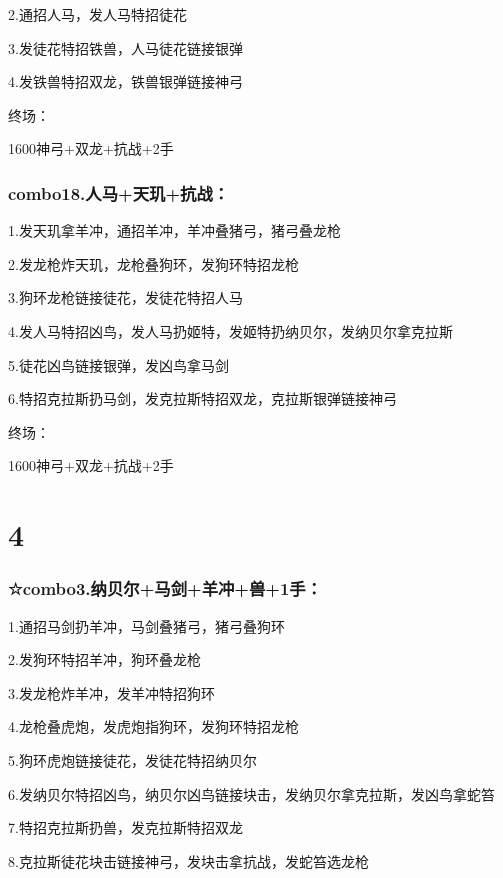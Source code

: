 \documentclass[
]{article}
\begin{document}
2.通招人马，发人马特招徒花

3.发徒花特招铁兽，人马徒花链接银弹

4.发铁兽特招双龙，铁兽银弹链接神弓

终场：

1600神弓+双龙+抗战+2手

\hypertarget{combo18.ux4ebaux9a6cux5929ux7391ux6297ux6218}{%
\subsubsection{combo18.人马+天玑+抗战：}\label{combo18.ux4ebaux9a6cux5929ux7391ux6297ux6218}}

1.发天玑拿羊冲，通招羊冲，羊冲叠猪弓，猪弓叠龙枪

2.发龙枪炸天玑，龙枪叠狗环，发狗环特招龙枪

3.狗环龙枪链接徒花，发徒花特招人马

4.发人马特招凶鸟，发人马扔姬特，发姬特扔纳贝尔，发纳贝尔拿克拉斯

5.徒花凶鸟链接银弹，发凶鸟拿马剑

6.特招克拉斯扔马剑，发克拉斯特招双龙，克拉斯银弹链接神弓

终场：

1600神弓+双龙+抗战+2手

\hypertarget{section-3}{%
\section{4}\label{section-3}}

\hypertarget{combo3.ux7eb3ux8d1dux5c14ux9a6cux5251ux7f8aux51b2ux517d1ux624b}{%
\subsubsection{☆combo3.纳贝尔+马剑+羊冲+兽+1手：}\label{combo3.ux7eb3ux8d1dux5c14ux9a6cux5251ux7f8aux51b2ux517d1ux624b}}

1.通招马剑扔羊冲，马剑叠猪弓，猪弓叠狗环

2.发狗环特招羊冲，狗环叠龙枪

3.发龙枪炸羊冲，发羊冲特招狗环

4.龙枪叠虎炮，发虎炮指狗环，发狗环特招龙枪

5.狗环虎炮链接徒花，发徒花特招纳贝尔

6.发纳贝尔特招凶鸟，纳贝尔凶鸟链接块击，发纳贝尔拿克拉斯，发凶鸟拿蛇笞

7.特招克拉斯扔兽，发克拉斯特招双龙

8.克拉斯徒花块击链接神弓，发块击拿抗战，发蛇笞选龙枪
\end{document}
